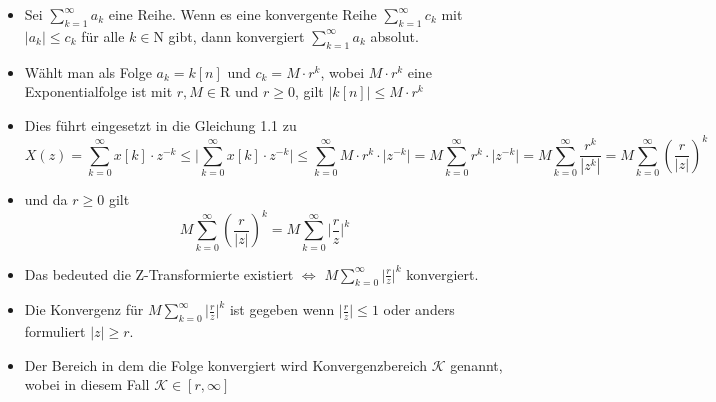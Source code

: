 \documentclass[11pt]{article}
\providecommand{\tightlist}{%
      \setlength{\itemsep}{0pt}\setlength{\parskip}{0pt}}
\begin{document}
    \begin{itemize}
\tightlist
\item
  Sei \(\sum_{k=1}^\infty a_k\) eine Reihe. Wenn es eine konvergente
  Reihe \(\sum_{k=1}^\infty c_k\) mit \(\big|a_k\big| \leqslant c_k\)
  für alle \(k \in \mathrm{N}\) gibt, dann konvergiert
  \(\sum_{k=1}^\infty a_k\) absolut.
\end{itemize}

    \begin{itemize}
\tightlist
\item
  Wählt man als Folge \(a_k = k[n]\) und \(c_k = M \cdot r^k\), wobei
  \(M \cdot r^k\) eine Exponentialfolge ist mit \(r, M \in \mathrm{R}\)
  und \(r \geq 0\), gilt \(\big|k[n]\big| \leqslant M \cdot r^k\)
\end{itemize}

    \begin{itemize}
\tightlist
\item
  Dies führt eingesetzt in die Gleichung 1.1 zu
  \[X(z) = \sum_{k=0}^\infty x[k] \cdot z^{-k} \leqslant \big| \sum_{k=0}^\infty x[k] \cdot z^{-k} \big| \leqslant \sum_{k=0}^\infty M \cdot r^k \cdot \big| z^{-k} \big| = M \sum_{k=0}^\infty r^k \cdot \big| z^{-k} \big| =  M \sum_{k=0}^\infty \frac {r^k}  {|z^{k}|} = M \sum_{k=0}^\infty (\frac {r}  {|z|})^k\]
\end{itemize}

    \begin{itemize}
\tightlist
\item
  und da \(r \geq 0\) gilt
  \[M \sum_{k=0}^\infty (\frac {r}  {|z|})^k = M \sum_{k=0}^\infty \big|\frac {r}  {z}\big|^k\]
\end{itemize}

    \begin{itemize}
\tightlist
\item
  Das bedeuted die Z-Transformierte existiert \(\iff\)
  \(M \sum_{k=0}^\infty \big|\frac {r} {z}\big|^k\) konvergiert.
\end{itemize}

    \begin{itemize}
\tightlist
\item
  Die Konvergenz für \(M \sum_{k=0}^\infty \big|\frac {r} {z}\big|^k\)
  ist gegeben wenn \(\big| \frac{r}{z} \big| \leq 1\) oder anders
  formuliert \(| z | \geq r\).
\end{itemize}

    \begin{itemize}
\tightlist
\item
  Der Bereich in dem die Folge konvergiert wird Konvergenzbereich
  \(\mathcal{K}\) genannt, wobei in diesem Fall
  \(\mathcal{K} \in [r,\infty]\)
\end{itemize}
\end{document}
